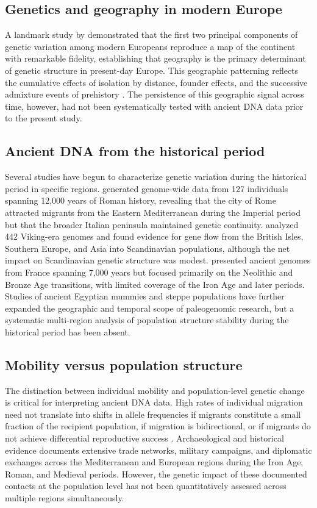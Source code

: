 \documentclass[11pt,a4paper]{article}
\begin{document}
\subsection{Genetics and geography in modern Europe}
A landmark study by \citet{novembre2008genes} demonstrated that the first two principal components of genetic variation among modern Europeans reproduce a map of the continent with remarkable fidelity, establishing that geography is the primary determinant of genetic structure in present-day Europe. This geographic patterning reflects the cumulative effects of isolation by distance, founder effects, and the successive admixture events of prehistory \citep{pickrell2014toward}. The persistence of this geographic signal across time, however, had not been systematically tested with ancient DNA data prior to the present study.

\subsection{Ancient DNA from the historical period}
Several studies have begun to characterize genetic variation during the historical period in specific regions. \citet{antonio2019ancient} generated genome-wide data from 127 individuals spanning 12,000 years of Roman history, revealing that the city of Rome attracted migrants from the Eastern Mediterranean during the Imperial period but that the broader Italian peninsula maintained genetic continuity. \citet{margaryan2020population} analyzed 442 Viking-era genomes and found evidence for gene flow from the British Isles, Southern Europe, and Asia into Scandinavian populations, although the net impact on Scandinavian genetic structure was modest. \citet{brunel2020ancient} presented ancient genomes from France spanning 7,000 years but focused primarily on the Neolithic and Bronze Age transitions, with limited coverage of the Iron Age and later periods. Studies of ancient Egyptian mummies \citep{schuenemann2017ancient} and steppe populations \citep{damgaard2018137} have further expanded the geographic and temporal scope of paleogenomic research, but a systematic multi-region analysis of population structure stability during the historical period has been absent.

\subsection{Mobility versus population structure}
The distinction between individual mobility and population-level genetic change is critical for interpreting ancient DNA data. High rates of individual migration need not translate into shifts in allele frequencies if migrants constitute a small fraction of the recipient population, if migration is bidirectional, or if migrants do not achieve differential reproductive success \citep{patterson2012ancient, reich2009reconstructing}. Archaeological and historical evidence documents extensive trade networks, military campaigns, and diplomatic exchanges across the Mediterranean and European regions during the Iron Age, Roman, and Medieval periods. However, the genetic impact of these documented contacts at the population level has not been quantitatively assessed across multiple regions simultaneously.
\end{document}
